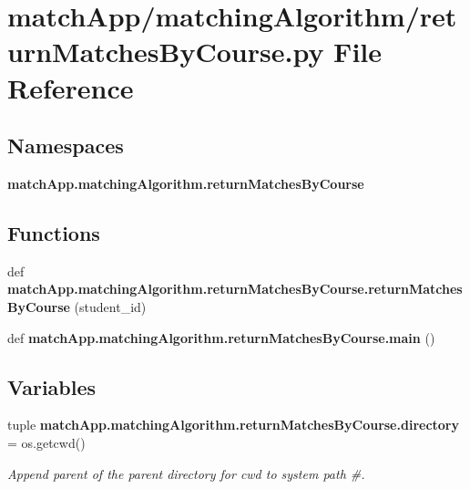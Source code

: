 \section{match\+App/matching\+Algorithm/return\+Matches\+By\+Course.py File Reference}
\label{return_matches_by_course_8py}
\subsection*{Namespaces}
\begin{DoxyCompactItemize}
\item 
 {\bf match\+App.\+matching\+Algorithm.\+return\+Matches\+By\+Course}
\end{DoxyCompactItemize}
\subsection*{Functions}
\begin{DoxyCompactItemize}
\item 
def {\bf match\+App.\+matching\+Algorithm.\+return\+Matches\+By\+Course.\+return\+Matches\+By\+Course} (student\+\_\+id)
\item 
def {\bf match\+App.\+matching\+Algorithm.\+return\+Matches\+By\+Course.\+main} ()
\end{DoxyCompactItemize}
\subsection*{Variables}
\begin{DoxyCompactItemize}
\item 
tuple {\bf match\+App.\+matching\+Algorithm.\+return\+Matches\+By\+Course.\+directory} = os.\+getcwd()
\begin{DoxyCompactList}\small\item\em Append parent of the parent directory for cwd to system path \#. \end{DoxyCompactList}\end{DoxyCompactItemize}
